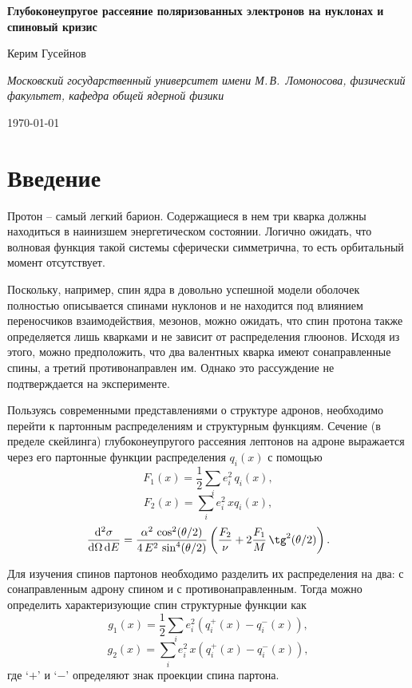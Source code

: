\documentclass[
	a4paper, 10pt,
	twocolumn
]{article}
\def\d{\,\mathrm{d}}
\begin{document}

\begin{strip}
\begin{center}
\baselineskip
{\bf\Large
	Глубоконеупругое рассеяние поляризованных электронов на нуклонах и спиновый кризис
}
\par\makeskip
{
	Керим Гусейнов\footnotemark
}
\par
{\it
	Московский государственный университет имени М.\,В.~Ломоносова, физический факультет, кафедра общей ядерной физики
}
\par
{
	\today
}
\end{center}
\end{strip}

\section{Введение}

Протон -- самый легкий барион. Содержащиеся в нем три кварка должны находиться в наинизшем энергетическом состоянии. Логично ожидать, что волновая функция такой системы сферически симметрична, то есть орбитальный момент отсутствует. 

Поскольку, например, спин ядра в довольно успешной модели оболочек полностью описывается спинами нуклонов и не находится под влиянием переносчиков взаимодействия, мезонов, можно ожидать, что спин протона также определяется лишь кварками и не зависит от распределения глюонов. 
Исходя из этого, можно предположить, что два валентных кварка имеют сонаправленные спины, а третий противонаправлен им. 
Однако это рассуждение не подтверждается на эксперименте. 

Пользуясь современными представлениями о структуре адронов, необходимо перейти к партонным распределениям и структурным функциям. 
Сечение (в пределе скейлинга) глубоконеупругого рассеяния лептонов на адроне выражается через его партонные функции распределения $q_i(x)$ с помощью 
$$ F_1(x) = \frac{1}{2}\sum_i e_i^2 \, q_i(x), $$
$$ F_2(x) = \sum_i e_i^2 \, xq_i(x), $$
$$ \frac{\!\d^2\sigma}{\!\d\Omega\d E} = \frac{\alpha^2\,\cos^2(\theta/2)}{4\,E^2\,\sin^4(\theta/2)} \left( \frac{F_2}{\nu} + 2 \frac{F_1}{M}\,\tg^2(\theta/2) \right). $$

Для изучения спинов партонов необходимо разделить их распределения на два: с сонаправленным адрону спином и с противонаправленным. Тогда можно определить характеризующие спин структурные функции как 
\begin{equation*}
g_1(x) = \frac{1}{2} \sum_i e_i^2 \left( q_i^+(x) - q_i^-(x) \right),
\label{eq:g1.def}
\end{equation*}
$$ g_2(x) = \sum_i e_i^2\,x\left( q_i^+(x) - q_i^-(x) \right), $$
где `$+$' и `$-$' определяют знак проекции спина партона. 
\end{document}
